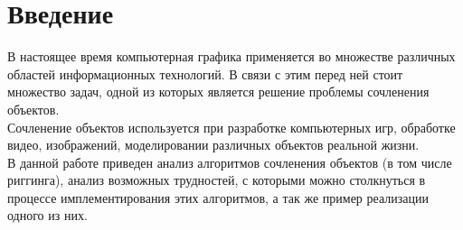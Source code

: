 \newpage
\section*{Введение}\label{sec:intro}

В настоящее время компьютерная графика применяется во множестве различных областей информационных технологий. В связи с этим перед ней стоит множество задач, одной из которых является решение проблемы сочленения объектов.\\

Сочленение объектов используется при разработке компьютерных игр, обработке видео, изображений, моделировании различных объектов реальной жизни.\\

В данной работе приведен анализ алгоритмов сочленения объектов (в том числе риггинга), анализ возможных трудностей, с которыми можно столкнуться в процессе имплементирования этих алгоритмов, а так же пример реализации одного из них.